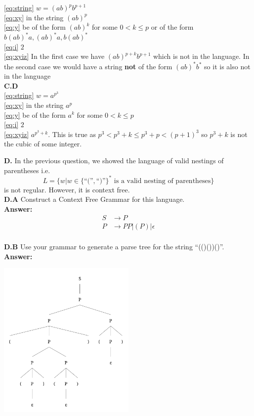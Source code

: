 \documentclass[10pt]{article}
\begin{document}
\noindent
\eqref{eq:string} $w=(ab)^pb^{p+1}$\\
\eqref{eq:xy} in the string $(ab)^p$\\
\eqref{eq:y} be of the form $(ab)^k$ for some $0<k\le p$ or of the form $b(ab)^*a,(ab)^*a, b(ab)^*$\\
\eqref{eq:i} $2$\\
\eqref{eq:xyiz} In the first case we have $(ab)^{p+k}b^{p+1}$ which is not in the language. In the second case we would have a string \textbf{not} of the form $(ab)^*b^*$ so it is also not in the language\\

\noindent
\textbf{C.D}\\

\noindent
\eqref{eq:string} $w=a^{p^3}$\\
\eqref{eq:xy} in the string $a^p$\\
\eqref{eq:y} be of the form $a^k$ for some $0<k\le p$\\
\eqref{eq:i} $2$\\
\eqref{eq:xyiz} $a^{p^3+k}.$ This is true as $p^3<p^3+k\le p^3+p<(p+1)^3$ so $p^3+k$ is not the cubic of some integer.\\

\newpage

\noindent
\textbf{D.} In the previous question, we showed the language of valid nestings of parentheses i.e. $$L=\{w|w\in\{\text{``(''}, \text{``)''}\}^* \text{ is a valid nesting of parentheses}\}$$ is not regular. However, it is context free.\\
\textbf{D.A} Construct a Context Free Grammar for this language.\\

\noindent
\textbf{Answer:}\\
\begin{align*}
    S &\to P\\
    P &\to PP|(P)|\epsilon
\end{align*}\\


\noindent
\textbf{D.B} Use your grammar to generate a parse tree for the string ``(()())()''.\\


\noindent
\textbf{Answer:}

\begin{center}
    \includegraphics[width=0.5\textwidth]{parse_tree.png}
\end{center}
\end{document}
